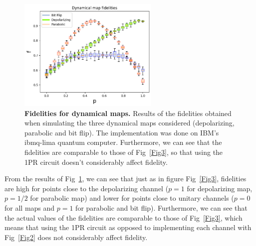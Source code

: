 \documentclass[10pt,letterpaper]{article} %
\newcommand{\fref}[1]{Fig~\ref{#1}}
\begin{document}
{\color{green}
\begin{figure} %
\centering
\includegraphics[width=0.60\textwidth]{dynamic-fidelitites.png}
\caption{
{\bf Fidelities for dynamical maps.} Results of the fidelities obtained when simulating the three dynamical maps considered (depolarizing, parabolic and bit flip). 
The implementation was done on IBM's ibmq-lima quantum computer.
Furthermore, we can see that the fidelities are comparable to those of \fref{Fig3}, so that using the 1PR circuit
doesn't considerably affect fidelity.}
\label{fid} 
\end{figure} %
}

From the results of \fref{fid}, we can see that just as in figure 
\fref{Fig3}, fidelities are high for points close to the depolarizing channel 
($p=1$ for depolarizing map, $p=1/2$ for parabolic map) and lower for points close
to unitary channels ($p=0$ for all maps and $p=1$ for parabolic and bit flip).
Furthermore, we can see that the actual values of the fidelities are comparable
to those of \fref{Fig3}, which means that
using the 1PR circuit as opposed to 
implementing each channel with \fref{Fig2}
does not considerably affect fidelity.
\end{document}
